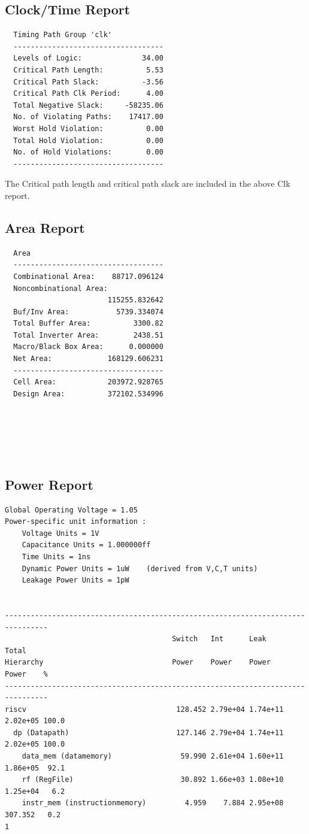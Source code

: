 \documentclass[a4paper]{article}
\begin{document}
\subsection{Clock/Time Report}
\begin{verbatim}
  Timing Path Group 'clk'
  -----------------------------------
  Levels of Logic:              34.00
  Critical Path Length:          5.53
  Critical Path Slack:          -3.56
  Critical Path Clk Period:      4.00
  Total Negative Slack:     -58235.06
  No. of Violating Paths:    17417.00
  Worst Hold Violation:          0.00
  Total Hold Violation:          0.00
  No. of Hold Violations:        0.00
  -----------------------------------
\end{verbatim}

The Critical path length and critical path slack are included in the above Clk report.

\subsection{Area Report}
\begin{verbatim}
  Area
  -----------------------------------
  Combinational Area:    88717.096124
  Noncombinational Area:
                        115255.832642
  Buf/Inv Area:           5739.334074
  Total Buffer Area:          3300.82
  Total Inverter Area:        2438.51
  Macro/Black Box Area:      0.000000
  Net Area:             168129.606231
  -----------------------------------
  Cell Area:            203972.928765
  Design Area:          372102.534996






\end{verbatim}

\subsection{Power Report}
\begin{verbatim}
Global Operating Voltage = 1.05 
Power-specific unit information :
    Voltage Units = 1V
    Capacitance Units = 1.000000ff
    Time Units = 1ns
    Dynamic Power Units = 1uW    (derived from V,C,T units)
    Leakage Power Units = 1pW


--------------------------------------------------------------------------------
                                       Switch   Int      Leak     Total
Hierarchy                              Power    Power    Power    Power    %
--------------------------------------------------------------------------------
riscv                                   128.452 2.79e+04 1.74e+11 2.02e+05 100.0
  dp (Datapath)                         127.146 2.79e+04 1.74e+11 2.02e+05 100.0
    data_mem (datamemory)                59.990 2.61e+04 1.60e+11 1.86e+05  92.1
    rf (RegFile)                         30.892 1.66e+03 1.08e+10 1.25e+04   6.2
    instr_mem (instructionmemory)         4.959    7.884 2.95e+08  307.352   0.2
1

\end{verbatim}
\end{document}
